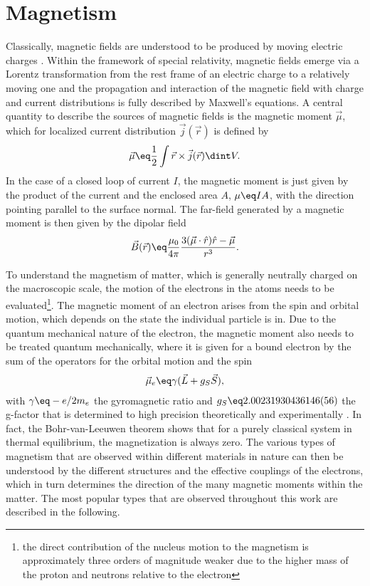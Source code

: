 \documentclass[\main/dresen_thesis.tex]{subfiles}
\begin{document}
\section{Magnetism}\label{ch:theoreticalBackground:magnetism}

  Classically, magnetic fields are understood to be produced by moving electric charges \cite{Jackson_1999_Class, Blundell_2001_Magne}.
  Within the framework of special relativity, magnetic fields emerge via a Lorentz transformation from the rest frame of an electric charge to a relatively moving one and the propagation and interaction of the magnetic field with charge and current distributions is fully described by Maxwell's equations.
  A central quantity to describe the sources of magnetic fields is the magnetic moment $\vec{\mu}$, which for localized current distribution $\vec{j}(\vec{r})$ is defined by
  \begin{align}
    \vec{\mu} \eq \frac{1}{2} \int \vec{r} \times \vec{j}(\vec{r}) \dint V .
  \end{align}
  In the case of a closed loop of current $I$, the magnetic moment is just given by the product of the current and the enclosed area $A$, $\mu \eq I A$, with the direction pointing parallel to the surface normal.
  The far-field generated by a magnetic moment is then given by the dipolar field
  \begin{align}\label{eq:theoreticalBackground:magnetism:dipolarField}
    \vec{B} (\vec{r}) \eq \frac{\mu_0}{4 \pi} \frac{3(\vec{\mu} \cdot \hat{r})\hat{r} - \vec{\mu}}{r^3}.
  \end{align}

  To understand the magnetism of matter, which is generally neutrally charged on the macroscopic scale, the motion of the electrons in the atoms needs to be evaluated\footnote{the direct contribution of the nucleus motion to the magnetism is approximately three orders of magnitude weaker due to the higher mass of the proton and neutrons relative to the electron}.
  The magnetic moment of an electron arises from the spin and orbital motion, which depends on the state the individual particle is in.
  Due to the quantum mechanical nature of the electron, the magnetic moment also needs to be treated quantum mechanically, where it is given for a bound electron by the sum of the operators for the orbital motion and the spin \cite{Coey_2010_Magne}
  \begin{align}
    \vec{\mu}_e \eq \gamma (\vec{L} + g_S \vec{S}),
  \end{align}
  with $\gamma \eq -e/2m_e$ the gyromagnetic ratio and $g_S \eq 2.00231930436146(56)$ the g-factor that is determined to high precision theoretically and experimentally \cite{Aoyama_2012_Tenth, Hanneke_2011_Cavit}.
  In fact, the Bohr-van-Leeuwen theorem shows that for a purely classical system in thermal equilibrium, the magnetization is always zero.
  The various types of magnetism that are observed within different materials in nature can then be understood by the different structures and the effective couplings of the electrons, which in turn determines the direction of the many magnetic moments within the matter.
  The most popular types that are observed throughout this work are described in the following.
\end{document}
